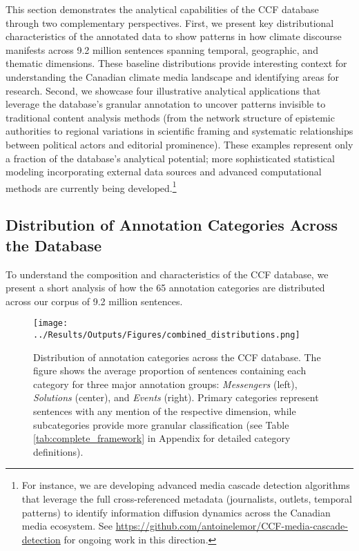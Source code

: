 \documentclass[12pt]{article}
\begin{document}
This section demonstrates the analytical capabilities of the CCF database through two complementary perspectives. First, we present key distributional characteristics of the annotated data to show patterns in how climate discourse manifests across 9.2 million sentences spanning temporal, geographic, and thematic dimensions. These baseline distributions provide interesting context for understanding the Canadian climate media landscape and identifying areas for research. Second, we showcase four illustrative analytical applications that leverage the database's granular annotation to uncover patterns invisible to traditional content analysis methods (from the network structure of epistemic authorities to regional variations in scientific framing and systematic relationships between political actors and editorial prominence). These examples represent only a fraction of the database's analytical potential; more sophisticated statistical modeling incorporating external data sources and advanced computational methods are currently being developed.\footnote{For instance, we are developing advanced media cascade detection algorithms that leverage the full cross-referenced metadata (journalists, outlets, temporal patterns) to identify information diffusion dynamics across the Canadian media ecosystem. See \url{https://github.com/antoinelemor/CCF-media-cascade-detection} for ongoing work in this direction.}

\subsection{Distribution of Annotation Categories Across the Database}

To understand the composition and characteristics of the CCF database, we present a short analysis of how the 65 annotation categories are distributed across our corpus of 9.2 million sentences.

\begin{figure}[b!]
\centering
\texttt{[image: ../Results/Outputs/Figures/combined\_distributions.png]}
\caption{Distribution of annotation categories across the CCF database. The figure shows the average proportion of sentences containing each category for three major annotation groups: \emph{Messengers} (left), \emph{Solutions} (center), and \emph{Events} (right). Primary categories represent sentences with any mention of the respective dimension, while subcategories provide more granular classification (see Table \ref{tab:complete_framework} in Appendix for detailed category definitions).}
\label{fig:combined_distributions}
\end{figure}
\end{document}
